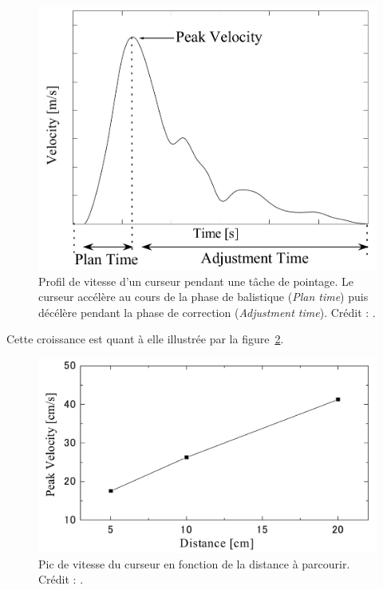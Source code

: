 	\begin{figure}[H]
		\centering
		\includegraphics[width=\textwidth]{figures/ch2/delphianPeak}
		\caption[Profil de vitesse d'un curseur pendant une tâche de pointage]{Profil de vitesse d'un curseur pendant une tâche de pointage. Le curseur accélère au cours de la phase de balistique (\emph{Plan time}) puis décélère pendant la phase de correction (\emph{Adjustment time}). Crédit : \cite{asano2005predictive}.}
		\label{fig:delphianPeak}
	\end{figure}
	
	Cette croissance est quant à elle illustrée par la figure~\ref{fig:delphianSpeedDist}.
	
	\begin{figure}[H]
		\centering
		\includegraphics[width=\textwidth]{figures/ch2/delphianSpeedDist}
		\caption[Pic de vitesse du curseur en fonction de la distance à parcourir]{Pic de vitesse du curseur en fonction de la distance à parcourir. Crédit : \cite{asano2005predictive}.}
		\label{fig:delphianSpeedDist}
	\end{figure}
	

